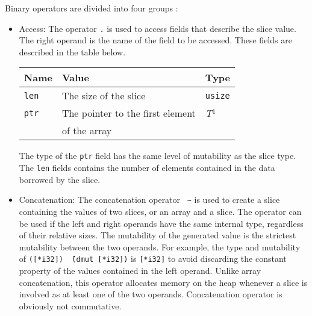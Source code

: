 Binary operators are divided into four groups :
\begin{itemize}
\item Access: The operator \texttt{.} is used to access fields that describe the slice value. The right operand is the name of the field to be accessed. These fields are described in the table below.

  \begin{center}\begin{adjustbox}{max width=\linewidth}
      \begin{threeparttable}
        \begin{tabular}{|l|ll|}
          \hline
          Name & Value & Type\\
          \hline
          \hline
          \texttt{len} & The size of the slice & \texttt{usize} \\
          \texttt{ptr} & The pointer to the first element  & \textit{T}$^{1^{\phantom{j}}}$ \\
          & of the array & \\
          \hline
        \end{tabular}
      \end{threeparttable}
  \end{adjustbox}\end{center}

  The type of the \texttt{ptr} field has the same level of mutability as the
  slice type. The \texttt{len} fields contains the number of elements contained
  in the data borrowed by the slice.

\item Concatenation: The concatenation operator ~\texttt{\~} is used to create a
  slice containing the values of two slices, or an array and a slice. The
  operator can be used if the left and right operands have the same internal
  type, regardless of their relative sizes. The mutability of the generated
  value is the strictest mutability between the two operands. For example, the
  type and mutability of \texttt{([*i32]) \~\ (dmut [*i32])} is \texttt{[*i32]}
  to avoid discarding the constant property of the values contained in the left
  operand. Unlike array concatenation, this operator allocates memory on the
  heap whenever a slice is involved as at least one of the two operands.
  Concatenation operator is obviously not commutative.


\end{itemize}
